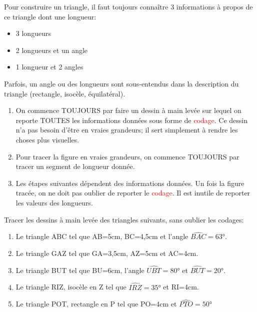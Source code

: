 \begin{methode*1}
Pour construire un triangle, il faut toujours connaître 3 informations à propos de ce triangle dont une longueur:
\begin{itemize}
    \item 3 longueurs
    \item 2 longueurs et un angle
    \item 1 longueur et 2 angles
\end{itemize}
Parfois, un angle ou des longueurs sont sous-entendus dans la description du triangle (rectangle, isocèle, équilatéral).
\begin{enumerate}
    \item On commence TOUJOURS par faire un dessin à main levée sur lequel on reporte TOUTES les informations données sous forme de \textcolor{red}{codage}. Ce dessin n'a pas besoin d'être en vraies grandeurs; il sert simplement à rendre les choses plus visuelles.
    \item Pour tracer la figure en vraies grandeurs, on commence TOUJOURS par tracer un segment de longueur donnée.
    \item Les étapes suivantes dépendent des informations données. Un fois la figure tracée, on ne doit pas oublier de reporter le \textcolor{red}{codage}. Il est inutile de reporter les valeurs des longueurs.\\
\end{enumerate}
\exercice
Tracer les dessins à main levée des triangles suivants, sans oublier les codages:\\
\begin{enumerate}
    \item Le triangle ABC tel que AB=5cm, BC=4,5cm et l'angle $\widehat{BAC}=63°$.
    \item Le triangle GAZ tel que GA=3,5cm, AZ=5cm et AC=4cm.
    \item Le triangle BUT tel que BU=6cm, l'angle $\widehat{UBT}=80°$ et $\widehat{BUT}=20°$.
    \item Le triangle RIZ, isocèle en Z tel que $\widehat{IRZ}=35°$ et RI=4cm.
    \item Le triangle POT, rectangle en P tel que PO=4cm et $\widehat{PTO}=50°$
\end{enumerate}
\end{methode*1}
